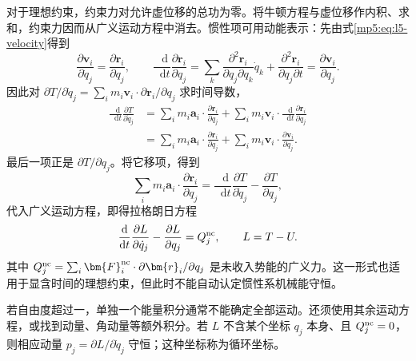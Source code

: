 \documentclass[11pt,openany,fontset=fandol]{ctexbook}
\theoremstyle{definition}\newtheorem{example}{例}[chapter]\newtheorem{exercise}{习题}[chapter]
\newcommand{\dd}{\mathop{}\!\mathrm d}\newcommand{\ee}{\mathrm e}\newcommand{\vct}[1]{\bm{#1}}
\begin{document}
对于理想约束，约束力对允许虚位移的总功为零。将牛顿方程与虚位移作内积、求和，约束力因而从广义运动方程中消去。惯性项可用动能表示：先由式\eqref{mp5:eq:l5-velocity}得到
\[
\frac{\partial\vct v_i}{\partial\dot q_j}
=\frac{\partial\vct r_i}{\partial q_j},\qquad
\frac{\dd}{\dd t}\frac{\partial\vct r_i}{\partial q_j}
=\sum_k\frac{\partial^2\vct r_i}{\partial q_j\partial q_k}\dot q_k
+\frac{\partial^2\vct r_i}{\partial q_j\partial t}
=\frac{\partial\vct v_i}{\partial q_j}.
\]
因此对 $\partial T/\partial\dot q_j=\sum_i m_i\vct v_i\cdot\partial\vct r_i/\partial q_j$ 求时间导数，
\[
\begin{aligned}
\frac{\dd}{\dd t}\frac{\partial T}{\partial\dot q_j}
&=\sum_i m_i\vct a_i\cdot\frac{\partial\vct r_i}{\partial q_j}
+\sum_i m_i\vct v_i\cdot\frac{\dd}{\dd t}\frac{\partial\vct r_i}{\partial q_j}\\
&=\sum_i m_i\vct a_i\cdot\frac{\partial\vct r_i}{\partial q_j}
+\sum_i m_i\vct v_i\cdot\frac{\partial\vct v_i}{\partial q_j}.
\end{aligned}
\]
最后一项正是 $\partial T/\partial q_j$。将它移项，得到
\[
\sum_i m_i\vct a_i\cdot\frac{\partial\vct r_i}{\partial q_j}
=\frac{\dd}{\dd t}\frac{\partial T}{\partial\dot q_j}
-\frac{\partial T}{\partial q_j},
\]
代入广义运动方程，即得拉格朗日方程
\begin{equation}\label{mp5:eq:l5-lagrange}
\frac{\dd}{\dd t}\frac{\partial L}{\partial\dot q_j}
-\frac{\partial L}{\partial q_j}=Q_j^{\rm nc},
\qquad L=T-U.
\end{equation}
其中 $Q_j^{\rm nc}=\sum_i\vct F_i^{\rm nc}\cdot\partial\vct r_i/\partial q_j$ 是未收入势能的广义力。这一形式也适用于显含时间的理想约束，但此时不能自动认定惯性系机械能守恒。

若自由度超过一，单独一个能量积分通常不能确定全部运动。还须使用其余运动方程，或找到动量、角动量等额外积分。若 $L$ 不含某个坐标 $q_j$ 本身、且 $Q_j^{\rm nc}=0$，则相应动量 $p_j=\partial L/\partial\dot q_j$ 守恒；这种坐标称为循环坐标。
\end{document}

